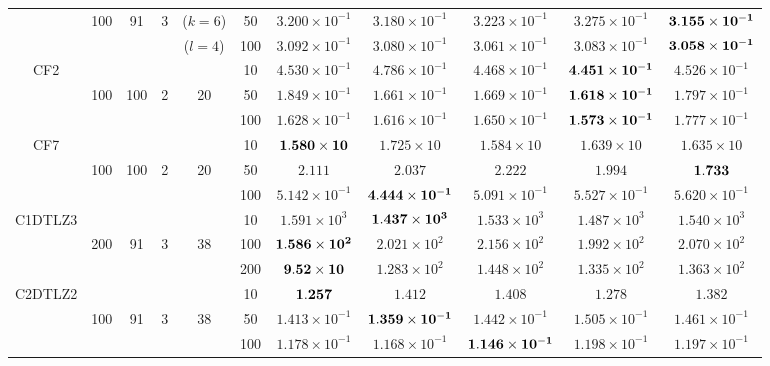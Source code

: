 \documentclass[../main/main]{subfiles}
\begin{document}
\begin{table}[htbp]
\begin{tabular}{c|ccccc|c|c|c|c|c}
  				   &100 & 91 & 3 &  ($k=6$)& 50 &$3.200 \times 10^{-1}$ & $3.180 \times 10^{-1}$ & $3.223 \times 10^{-1}$ & $3.275 \times 10^{-1}$ & $\bf{3.155 \times 10^{-1}}$\\
				   &        &    && ($l=4$)   &100 &$3.092 \times 10^{-1}$ & $3.080 \times 10^{-1}$ & $3.061 \times 10^{-1}$ & $3.083 \times 10^{-1}$ & $\bf{3.058 \times 10^{-1}}$\\				   			   
\hline
\multirow{3}{*}{CF2} &        &    &&   & 10 &$4.530 \times 10^{-1}$ & $4.786 \times 10^{-1}$ & $4.468 \times 10^{-1}$ & $\bf{4.451 \times 10^{-1}}$ & $4.526 \times 10^{-1}$\\
  				   &100 & 100 & 2 & 20 & 50 &$1.849 \times 10^{-1}$ & $1.661 \times 10^{-1}$ & $1.669 \times 10^{-1}$ & $\bf{1.618 \times 10^{-1}}$ & $1.797 \times 10^{-1}$\\
				   &   &&     &        &100 &$1.628 \times 10^{-1}$ & $1.616 \times 10^{-1}$ & $1.650 \times 10^{-1}$ & $\bf{1.573 \times 10^{-1}}$ & $1.777 \times 10^{-1}$\\
\hline
\multirow{3}{*}{CF7} &   &&     &       & 10 &$\bf{1.580 \times 10}$ & $1.725 \times 10$ & $1.584 \times 10$ & $1.639 \times 10$ & $1.635 \times 10$\\
  				   &100 & 100 & 2 & 20 & 50 &$2.111$ & $2.037$ & $2.222$ & $1.994$ & $\bf{1.733}$\\
				   &        &    &&    &100 &$5.142 \times 10^{-1}$ & $\bf{4.444 \times 10^{-1}}$ & $5.091 \times 10^{-1}$ & $5.527 \times 10^{-1}$ & $5.620 \times 10^{-1}$\\

\hline
\multirow{3}{*}{C1DTLZ3} &      &&  &     & 10 &$1.591 \times 10^{3}$ & $\bf{1.437 \times 10^{3}}$ & $1.533 \times 10^{3}$ & $1.487 \times 10^{3}$ & $1.540 \times 10^{3}$\\
                                          &200 & 91 & 3 & 38 & 100 &$\bf{1.586 \times 10^{2}}$ & $2.021 \times 10^{2}$ & $2.156 \times 10^{2}$ & $1.992 \times 10^{2}$ & $2.070 \times 10^{2}$\\
				   &        &  &&      &200 &$\bf{9.52 \times 10}$ & $1.283 \times 10^{2}$ & $1.448 \times 10^{2}$ & $1.335 \times 10^{2}$ & $1.363 \times 10^{2}$\\
\hline
\multirow{3}{*}{C2DTLZ2} &   &&     &       & 10 &$\bf{1.257}$ & $1.412$ & $1.408$ & $1.278$ & $1.382$\\
  				   &100 & 91 & 3 & 38 & 50 &$1.413 \times 10^{-1}$ & $\bf{1.359 \times 10^{-1}}$ & $1.442 \times 10^{-1}$ & $1.505 \times 10^{-1}$ & $1.461 \times 10^{-1}$\\
			convex	   &        &    &&    &100  &$1.178 \times 10^{-1}$ & $1.168 \times 10^{-1}$ & $\bf{1.146 \times 10^{-1}}$ & $1.198 \times 10^{-1}$ & $1.197 \times 10^{-1}$\\


\end{tabular}
\end{table}
\end{document}
